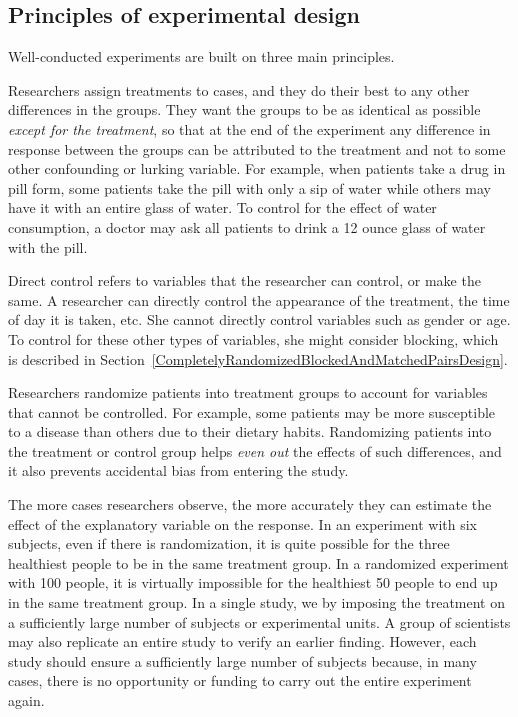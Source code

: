 
\subsection{Principles of experimental design}
\label{experimentalDesignPrinciples}

\noindent Well-conducted experiments are built on three main principles.

\begin{description}
\setlength{\itemsep}{0mm}
\item[\termsub{Direct Control.}{direct control}] Researchers assign treatments to cases, and they do their best to  any other differences in the groups. They want the groups to be as identical as possible \emph{except for the treatment}, so that at the end of the experiment any difference in response between the groups can be attributed to the treatment and not to some other confounding or lurking variable. For example, when patients take a drug in pill form, some patients take the pill with only a sip of water while others may have it with an entire glass of water. To control for the effect of water consumption, a doctor may ask all patients to drink a 12 ounce glass of water with the pill.

Direct control refers to variables that the researcher can control, or make the same. A researcher can directly control the appearance of the treatment, the time of day it is taken, etc. She cannot directly control variables such as gender or age. To control for these other types of variables, she might consider blocking, which is described in Section~\ref{CompletelyRandomizedBlockedAndMatchedPairsDesign}.

\item[Randomization.] Researchers randomize patients into treatment groups to account for variables that cannot be controlled. For example, some patients may be more susceptible to a disease than others due to their dietary habits. Randomizing patients into the treatment or control group helps \emph{even out} the effects of such differences, and it also prevents accidental bias from entering the study.

\item[Replication.] The more cases researchers observe, the more accurately they can estimate the effect of the explanatory variable on the response. In an experiment with six subjects, even if there is randomization, it is quite possible for the three healthiest people to be in the same treatment group. In a randomized experiment with 100 people, it is virtually impossible for the healthiest 50 people to end up in the same treatment group. In a single study, we  by imposing the treatment on a sufficiently large number of subjects or experimental units. A group of scientists may also replicate an entire study to verify an earlier finding. However, each study should ensure a sufficiently large number of subjects because, in many cases, there is no opportunity or funding to carry out the entire experiment again.
\end{description}

